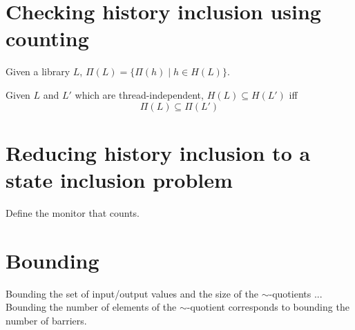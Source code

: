 \section{Checking history inclusion using counting}

Given a library $L$, $\Pi(L)=\{\Pi(h)\mid h\in H(L)\}$.

\begin{lemma}
Given $L$ and $L'$ which are thread-independent, $H(L)\subseteq H(L')$ iff
\[
\Pi(L) \subseteq \Pi(L')
\]
\end{lemma}
 
\section{Reducing history inclusion to a state inclusion problem}

Define the monitor that counts.
 
\section{Bounding}

Bounding the set of input/output values and the size of the $\sim$-quotients ... Bounding the number of elements of the $\sim$-quotient corresponds to bounding the number of barriers.

